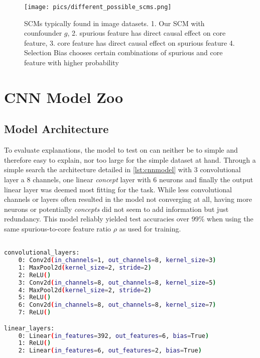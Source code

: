 \begin{figure}[H]
    \centering
    \texttt{[image: pics/different\_possible\_scms.png]}
    \caption{SCMs typically found in image datasets.
        1. Our SCM with counfounder $g$,
        2. spurious feature has direct causal effect on core feature,
        3. core feature has direct causal effect on spurious feature 4. Selection Bias chooses certain combinations of spurious and core feature with higher probability}
    \label{fig:possible_scms}
\end{figure}

\section{CNN Model Zoo}\label{section:training}
\subsection{Model Architecture}
To evaluate explanations, the model to test on can neither be to simple and therefore easy to explain, nor too large for the simple dataset at hand.
Through a simple search the architecture detailed in \autoref{lst:cnnmodel} with 3 convolutional layer a 8 channels, one linear \textit{concept} layer with 6 neurons and finally the output linear layer was deemed most fitting for the task. While less convolutional channels or layers often resulted in the model not converging at all, having more neurons or potentially \textit{concepts} did not seem to add information but just redundancy.
This model reliably yielded test accuracies over 99\% when using the same spurious-to-core feature ratio $\rho$ as used for training.

\begin{lstlisting}[language=bash, label=lst:cnnmodel]

convolutional_layers: 
    0: Conv2d(in_channels=1, out_channels=8, kernel_size=3)
    1: MaxPool2d(kernel_size=2, stride=2)
    2: ReLU()
    3: Conv2d(in_channels=8, out_channels=8, kernel_size=5)
    4: MaxPool2d(kernel_size=2, stride=2)
    5: ReLU()
    6: Conv2d(in_channels=8, out_channels=8, kernel_size=7)
    7: ReLU()

linear_layers:
    0: Linear(in_features=392, out_features=6, bias=True)
    1: ReLU()
    2: Linear(in_features=6, out_features=2, bias=True)  

\end{lstlisting}

